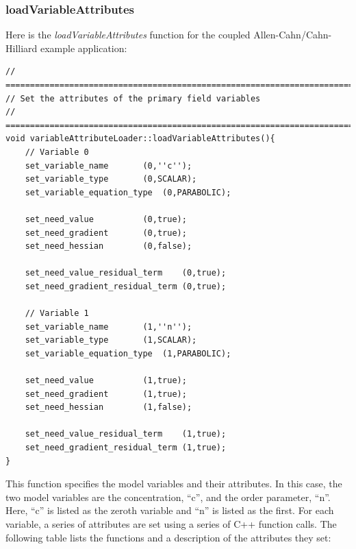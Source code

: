 \documentclass[10pt]{article} %
\begin{document}
\subsubsection{loadVariableAttributes}
Here is the \emph{loadVariableAttributes} function for the coupled Allen-Cahn/Cahn-Hilliard example application:
\scriptsize
\begin{lstlisting}
// =================================================================================
// Set the attributes of the primary field variables
// =================================================================================
void variableAttributeLoader::loadVariableAttributes(){
	// Variable 0
	set_variable_name		(0,''c'');
	set_variable_type		(0,SCALAR);
	set_variable_equation_type	(0,PARABOLIC);

	set_need_value			(0,true);
	set_need_gradient		(0,true);
	set_need_hessian		(0,false);

	set_need_value_residual_term	(0,true);
	set_need_gradient_residual_term	(0,true);

  	// Variable 1
	set_variable_name		(1,''n'');
	set_variable_type		(1,SCALAR);
	set_variable_equation_type	(1,PARABOLIC);

	set_need_value			(1,true);
	set_need_gradient		(1,true);
	set_need_hessian		(1,false);

	set_need_value_residual_term	(1,true);
	set_need_gradient_residual_term	(1,true);
}
\end{lstlisting}
\normalsize

This function specifies the model variables and their attributes. In this case, the two model variables are the concentration, ``c'', and the order parameter, ``n''. Here, ``c'' is listed as the zeroth variable and ``n'' is listed as the first. For each variable, a series of attributes are set using a series of C++ function calls. The following table lists the functions and a description of the attributes they set:
\end{document}
